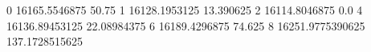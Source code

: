 0 16165.5546875 50.75
1 16128.1953125 13.390625
2 16114.8046875 0.0
4 16136.89453125 22.08984375
6 16189.4296875 74.625
8 16251.9775390625 137.1728515625
